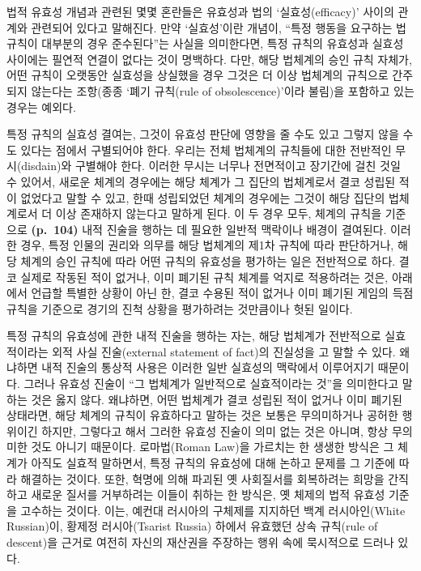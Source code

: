 법적 유효성 개념과 관련된 몇몇 혼란들은 유효성과 법의 `실효성(efficacy)'
사이의 관계와 관련되어 있다고 말해진다. 만약 `실효성'이란 개념이, ``특정
행동을 요구하는 법 규칙이 대부분의 경우 준수된다''는 사실을 의미한다면,
특정 규칙의 유효성과  실효성 사이에는 필연적 연결이
없다는 것이 명백하다. 다만, 해당 법체계의 승인 규칙 자체가, 어떤 규칙이
오랫동안 실효성을 상실했을 경우 그것은 더 이상 법체계의 규칙으로
간주되지 않는다는 조항(종종 `폐기 규칙(rule of obsolescence)'이라
불림)을 포함하고 있는 경우는 예외다.

특정 규칙의 실효성 결여는, 그것이 유효성 판단에 영향을 줄 수도 있고
그렇지 않을 수도 있다는 점에서 구별되어야 한다. 우리는 전체 법체계의
규칙들에 대한 전반적인 무시(disdain)와 구별해야 한다. 이러한 무시는
너무나 전면적이고 장기간에 걸친 것일 수 있어서, 새로운 체계의 경우에는
해당 체계가 그 집단의 법체계로서 결코 성립된 적이 없었다고 말할 수 있고,
한때 성립되었던 체계의 경우에는 그것이 해당 집단의 법체계로서 더 이상
존재하지 않는다고 말하게 된다. 이 두 경우 모두, 체계의 규칙을 기준으로
\textbf{(p.~104)} 내적 진술을 행하는 데 필요한 일반적 맥락이나 배경이
결여된다. 이러한 경우, 특정 인물의 권리와 의무를 해당 법체계의 제1차
규칙에 따라 판단하거나, 해당 체계의 승인 규칙에 따라 어떤 규칙의
유효성을 평가하는 일은 전반적으로 하다. 결코
실제로 작동된 적이 없거나, 이미 폐기된 규칙 체계를 억지로 적용하려는
것은, 아래에서 언급할 특별한 상황이 아닌 한, 결코 수용된 적이 없거나
이미 폐기된 게임의 득점 규칙을 기준으로 경기의 진척 상황을 평가하려는
것만큼이나 헛된 일이다.

특정 규칙의 유효성에 관한 내적 진술을 행하는 자는, 해당 법체계가
전반적으로 실효적이라는 외적 사실 진술(external statement of fact)의
진실성을 고 말할 수 있다. 왜냐하면 내적
진술의 통상적 사용은 이러한 일반 실효성의 맥락에서 이루어지기 때문이다.
그러나 유효성 진술이 ``그 법체계가 일반적으로 실효적이라는 것''을
의미한다고 말하는 것은 옳지 않다. 왜냐하면, 어떤 법체계가 결코 성립된
적이 없거나 이미 폐기된 상태라면, 해당 체계의 규칙이 유효하다고 말하는
것은 보통은 무의미하거나 공허한 행위이긴 하지만, 그렇다고 해서 그러한
유효성 진술이 의미 없는 것은 아니며, 항상 무의미한 것도 아니기 때문이다.
로마법(Roman Law)을 가르치는 한 생생한 방식은 그 체계가 아직도
실효적 말하면서, 특정 규칙의 유효성에 대해 논하고
문제를 그 기준에 따라 해결하는 것이다. 또한, 혁명에 의해 파괴된 옛
사회질서를 회복하려는 희망을 간직하고 새로운 질서를 거부하려는 이들이
취하는 한 방식은, 옛 체제의 법적 유효성 기준을 고수하는 것이다. 이는,
예컨대 러시아의 구체제를 지지하던 백계 러시아인(White Russian)이, 황제정
러시아(Tsarist Russia) 하에서 유효했던 상속 규칙(rule of descent)을
근거로 여전히 자신의 재산권을 주장하는 행위 속에 묵시적으로 드러나 있다.

